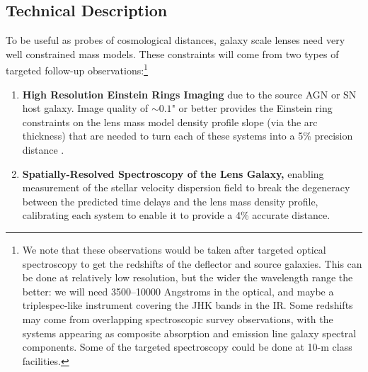 \subsection{Technical Description }




To be useful as probes of cosmological distances, galaxy scale lenses
need very well constrained mass models. These constraints will come from
two types of targeted follow-up observations:\footnote{
We note that these observations would be taken after targeted optical
spectroscopy to get the redshifts of the deflector and source galaxies.
This can be done at relatively low resolution, but the wider the
wavelength range the better: we will need 3500--10000 Angstroms in the
optical, and maybe a triplespec-like instrument covering the JHK bands
in the IR. Some redshifts may come from overlapping spectroscopic survey
observations, with the systems appearing as composite absorption and
emission line galaxy spectral components. Some of the targeted
spectroscopy could be done at 10-m class facilities.}
\begin{enumerate}
    \item {\bf High Resolution Einstein Rings Imaging} due to the
    source AGN or SN host galaxy. Image quality of $\sim0.1$" or better
    provides the Einstein ring constraints on the lens mass model
    density profile slope (via the arc thickness) that are
    needed to turn each of these systems into a  5\% precision distance
    \citep{MengEtal2015}.
    \item {\bf Spatially-Resolved Spectroscopy of the Lens Galaxy,} enabling
    measurement of the stellar velocity dispersion field to break the
    degeneracy between the predicted time delays and the lens mass
    density profile, calibrating each system to enable it to provide a
    4\% accurate distance.
\end{enumerate}

